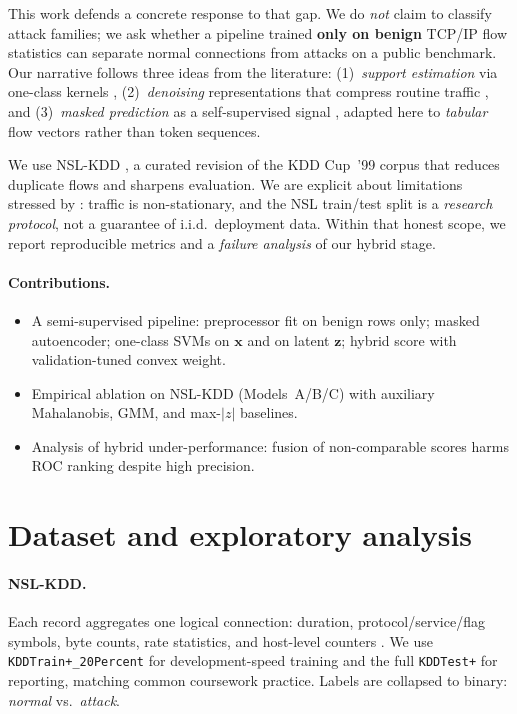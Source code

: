\documentclass[11pt,a4paper]{article}
\begin{document}
This work defends a concrete response to that gap. We do \emph{not} claim to classify attack families; we ask whether a pipeline trained \textbf{only on benign} TCP/IP flow statistics can separate normal connections from attacks on a public benchmark. Our narrative follows three ideas from the literature: (1)~\emph{support estimation} via one-class kernels \citep{scholkopf2001estimating,tax2004support}, (2)~\emph{denoising} representations that compress routine traffic \citep{vincent2008extracting}, and (3)~\emph{masked prediction} as a self-supervised signal \citep{devlin2019bert}, adapted here to \emph{tabular} flow vectors rather than token sequences.

We use NSL-KDD \citep{tavallaee2009detailed}, a curated revision of the KDD Cup~'99 corpus that reduces duplicate flows and sharpens evaluation. We are explicit about limitations stressed by \citet{mahoney2002learning}: traffic is non-stationary, and the NSL train/test split is a \emph{research protocol}, not a guarantee of i.i.d.\ deployment data. Within that honest scope, we report reproducible metrics and a \emph{failure analysis} of our hybrid stage.

\paragraph{Contributions.}
\begin{itemize}\itemsep=0.15em
  \item A semi-supervised pipeline: preprocessor fit on benign rows only; masked autoencoder; one-class SVMs on $\bm{x}$ and on latent $\bm{z}$; hybrid score with validation-tuned convex weight.
  \item Empirical ablation on NSL-KDD (Models~A/B/C) with auxiliary Mahalanobis, GMM, and max-$|z|$ baselines.
  \item Analysis of hybrid under-performance: fusion of non-comparable scores harms ROC ranking despite high precision.
\end{itemize}

\section{Dataset and exploratory analysis}
\label{sec:data}

\paragraph{NSL-KDD.} Each record aggregates one logical connection: duration, protocol/service/flag symbols, byte counts, rate statistics, and host-level counters \citep{tavallaee2009detailed}. We use \texttt{KDDTrain+\_20Percent} for development-speed training and the full \texttt{KDDTest+} for reporting, matching common coursework practice. Labels are collapsed to binary: \emph{normal} vs.\ \emph{attack}.
\end{document}

